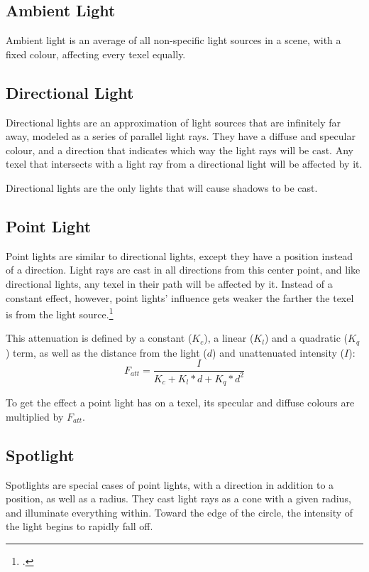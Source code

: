 \documentclass[11pt, oneside]{report}
\begin{document}
\subsection{Ambient Light}
Ambient light is an average of all non-specific light sources in a scene, with a fixed colour, affecting every \gls{texel} equally.

\subsection{Directional Light}
Directional lights are an approximation of light sources that are infinitely far away, modeled as a series of parallel light rays. They have a diffuse and specular colour, and a direction that indicates which way the light rays will be cast. Any \gls{texel} that intersects with a light ray from a directional light will be affected by it.

Directional lights are the only lights that will cause shadows to be cast.

\subsection{Point Light}
Point lights are similar to directional lights, except they have a position instead of a direction. Light rays are cast in all directions from this center point, and like directional lights, any \gls{texel} in their path will be affected by it. Instead of a constant effect, however, point lights' influence gets weaker the farther the \gls{texel} is from the light source.\footcite{pointlight-attenuate}	

This attenuation is defined by a constant ($K_c$), a linear ($K_l$) and a quadratic ($K_q$) term, as well as the distance from the light ($d$) and unattenuated intensity ($I$): \begin{equation} F_{att} = \frac{I}{K_c + K_l * d + K_q * d^2} \end{equation}

To get the effect a point light has on a \gls{texel}, its specular and diffuse colours are multiplied by $F_{att}$.

\subsection{Spotlight}
Spotlights are special cases of point lights, with a direction in addition to a position, as well as a radius. They cast light rays as a cone with a given radius, and illuminate everything within. Toward the edge of the circle, the intensity of the light begins to rapidly fall off.
\end{document}
